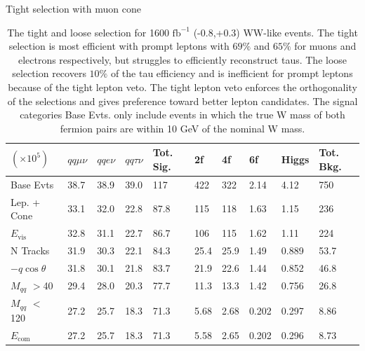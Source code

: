 \begin{table}

\caption{The tight and loose selection for 1600 $\text{fb}^{-1}$ (-0.8,+0.3) WW-like events. The tight selection is most efficient with prompt leptons with $69\%$ and $65\%$  for muons and electrons respectively, but struggles to efficiently reconstruct taus. The loose selection recovers $10\%$ of the tau efficiency and is inefficient for prompt leptons because of the tight lepton veto. The tight lepton veto enforces the orthogonality of the selections and gives preference toward better lepton candidates. The signal categories Base Evts. only include events in which the true W mass of both fermion pairs are within 10 GeV of the nominal W mass.}
\label{tab:selection}
 \scriptsize
 Tight selection with muon cone \\
   \begin{tabular}{|p{}|p{}p{}p{}|p{}|p{}p{}p{}p{}|p{}|}
\hline 
 $(\times 10^5)$  & $qq\mu\nu$ & $qqe\nu$ & $qq\tau\nu$ & Tot. Sig. & 2f & 4f & 6f & Higgs & Tot. Bkg. \\ \hline 
Base Evts & {38.7 } &  {38.9 } &  {39.0} & {117} &  {422} &  {322} &  {2.14} &  {4.12} & 750 \\ 

Lep. + Cone & {33.1 } &  {32.0 } &  {22.8} & {87.8} &  {115} &  {118} &  {1.63} &  {1.15} & 236 \\ 
 
$E_{\text{vis}}$ & {32.8 } &  {31.1 } &  {22.7} & {86.7} &  {106} &  {115} &  {1.62} &  {1.11} & 224\\ 
 
N Tracks & {31.9 } &  {30.3 } &  {22.1} & {84.3} &  {25.4} &  {25.9} &  {1.49} &  {0.889} & 53.7\\ 
 
$-q\cos\theta$ & {31.8 } &  {30.1 } &  {21.8} & {83.7} &  {21.9} &  {22.6} &  {1.44} &  {0.852} & 46.8\\ 
 
$M_{qq}$ $>$40 & {29.4 } &  {28.0 } &  {20.3} & {77.7} &  {11.3} &  {13.3} &  {1.42} &  {0.756} & 26.8\\ 
 
$M_{qq}$ $<$120 & {27.2 } &  {25.7 } &  {18.3} & {71.3} &  {5.68} &  {2.68} &  {0.202} &  {0.297} & 8.86\\ 
 
$E_{\text{com}}$ & {27.2 } &  {25.7} &  {18.3} & {71.3} &  {5.58} &  {2.65} &  {0.202} &  {0.296} & 8.73\\ 


\end{tabular}
\end{table}
